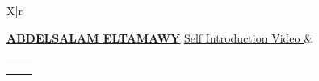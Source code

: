 \documentclass{resume}
\begin{document}
\begin{tabularx}{\textwidth}{X|r}
	
	{\href{https://www.youtube.com/watch?v=8wwv_bj3Hvc}{\LARGE\MakeUppercase{\bf Abdelsalam ElTamawy}}}
	{\small\href{https://www.youtube.com/watch?v=8wwv_bj3Hvc}{Self Introduction Video \iconin{\faYoutubePlay}}}
	&
	\small{
		\begin{tabular}{ll}
			\href{mailto:solomspd@aucegypt.edu}{\iconanot{\faEnvelope}{solomspd@aucegypt.edu}} & \href{tel:+0201003435365}{\iconanot{\faPhone}{(+02)01003435365}} \\
			\href{https://github.com/solomspd}{\iconanot{\faGithub}{github.com/solomspd}} & \iconanot{\faMapMarker}{Nasr City, Cairo, Egypt} \\
			\multicolumn{2}{l}{\href{https://linkedin.com/in/abdelsalam-et}{\iconanot{\faLinkedin}{linkedin.com/in/abdelsalam-et}}} \\
		\end{tabular}
	}
\end{tabularx}

\end{document}
